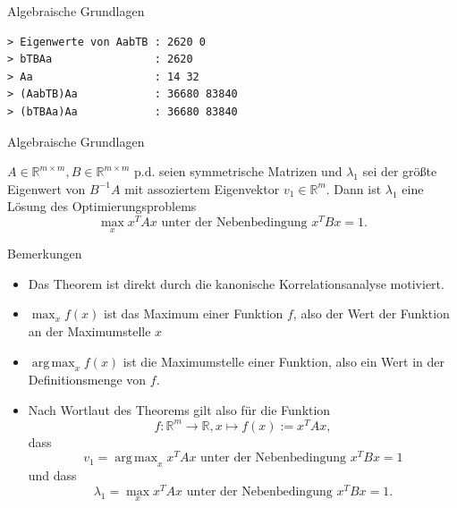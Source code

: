 \documentclass[
  8pt,
  ignorenonframetext,
]{beamer}
\providecommand{\tightlist}{%
  \setlength{\itemsep}{0pt}\setlength{\parskip}{0pt}}
\DeclareMathOperator*{\argmax}{arg\,max}
\begin{document}
\begin{frame}[fragile]{Algebraische Grundlagen}
\begin{verbatim}
> Eigenwerte von AabTB : 2620 0 
> bTBAa                : 2620 
> Aa                   : 14 32 
> (AabTB)Aa            : 36680 83840 
> (bTBAa)Aa            : 36680 83840
\end{verbatim}
\end{frame}

\begin{frame}{Algebraische Grundlagen}
\protect\hypertarget{algebraische-grundlagen-3}{}
\footnotesize
\begin{theorem}
\justifying
\normalfont
$A \in \mathbb{R}^{m \times m}, B \in \mathbb{R}^{m \times m} \mbox{ p.d.}$
seien symmetrische Matrizen und $\lambda_1$ sei der größte Eigenwert von $B^{-1}A$
mit assoziertem Eigenvektor $v_1 \in \mathbb{R}^m$. Dann ist $\lambda_1$ eine Lösung des
Optimierungsproblems
\begin{equation}\label{eq:opt_1}
\max_{x} x^TAx \mbox{ unter der Nebenbedingung } x^TBx = 1.
\end{equation}
\end{theorem}

Bemerkungen

\begin{itemize}
\tightlist
\item
  Das Theorem ist direkt durch die kanonische Korrelationsanalyse
  motiviert.
\item
  \(\max_{x} f(x)\) ist das Maximum einer Funktion \(f\), also der Wert
  der Funktion an der Maximumstelle \(x\)
\item
  \(\argmax_{x} f(x)\) ist die Maximumstelle einer Funktion, also ein
  Wert in der Definitionsmenge von \(f\).
\item
  Nach Wortlaut des Theorems gilt also für die Funktion \begin{equation}
  f : \mathbb{R}^m \to \mathbb{R}, x \mapsto f(x) := x^TAx,
  \end{equation} dass \begin{equation}
  v_1 = \argmax_{x} x^TAx \mbox{ unter der Nebenbedingung } x^TBx = 1
  \end{equation} und dass \begin{equation}
  \lambda_1 = \max_{x} x^TAx \mbox{ unter der Nebenbedingung } x^TBx = 1.
  \end{equation}
\end{itemize}
\end{frame}
\end{document}
